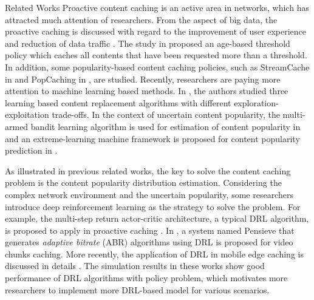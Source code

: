 \documentclass{article}
\begin{document}
\begin{section}{Related Works}
    \label{sec:review}
    Proactive content caching is an active area in networks, which has attracted much attention of researchers. From the aspect of big data, the proactive caching is discussed with regard to the improvement of user experience and reduction of data traffic \cite{rw1}. The study in \cite{rw3} proposed an age-based threshold policy which caches all contents that have been requested more than a threshold. In addition, some popularity-based content caching policies, such as StreamCache in \cite{rw4} and PopCaching in \cite{rw5}, are studied. Recently, researchers are paying more attention to machine learning based methods. In \cite{rw2}, the authors studied three learning based content replacement algorithms with different exploration-exploitation trade-offs. In the context of uncertain content popularity, the multi-armed bandit learning algorithm is used for estimation of content popularity in \cite{rw6} and an extreme-learning machine framework is proposed for content popularity prediction in \cite{rw7}.
    
    As illustrated in previous related works, the key to solve the content caching problem is the content popularity distribution estimation. Considering the complex network environment and the uncertain popularity, some researchers introduce deep reinforcement learning as the strategy to solve the problem. For example, the multi-step return actor-critic architecture, a typical DRL algorithm, is proposed to apply in proactive caching \cite{rw8}. In \cite{Pensieve}, a system named Pensieve that generates \emph{adaptive bitrate} (ABR) algorithms using DRL is proposed for video chunks caching. More recently, the application of DRL in mobile edge caching is discussed in details \cite{MEC}. The simulation results in these works show good performance of DRL algorithms with policy problem, which motivates more researchers to implement more DRL-based model for various scenarios.
\end{section}
\end{document}
